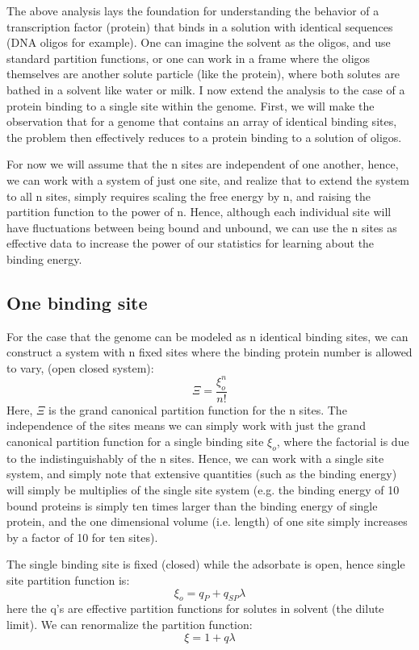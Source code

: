 The above analysis lays the foundation for understanding the behavior of a transcription factor (protein) that binds in a solution with identical sequences (DNA oligos for example).  One can imagine the solvent as the oligos, and use standard partition functions, or one can work in a frame where the oligos themselves are another solute particle (like the protein), where both solutes are bathed in a solvent like water or milk.  I now extend the analysis to the case of a protein binding to a single site within the genome.  First, we will make the observation that for a genome that contains an array of identical binding sites, the problem then effectively reduces to a protein binding to a solution of oligos.

For now we will assume that the n sites are independent of one another, hence, we can work with a system of just one site, and realize that to extend the system to all n sites, simply requires scaling the free energy by n, and raising the partition function to the power of n.  Hence, although each individual site will have fluctuations between being bound and unbound, we can use the n sites as effective data to increase the power of our statistics for learning about the binding energy.
\subsection{One binding site}
For the case that the genome can be modeled as n identical binding sites, we can construct a system with n fixed sites where the binding protein number is allowed to vary, (open closed system):
\begin{equation}\label{}
  \Xi = \frac{\xi_o^n}{n!}
\end{equation}
 Here, $\Xi$ is the grand canonical partition function for the n sites.  The independence of the sites means we can simply work with just the grand canonical partition function for a single binding site $\xi_o$, where the factorial is due to the indistinguishably of the n sites.  Hence, we can work with a single site system, and simply note that extensive quantities (such as the binding energy) will simply be multiplies of the single site system (e.g. the binding energy of 10 bound proteins is simply ten times larger than the binding energy of single protein, and the one dimensional volume (i.e. length) of one site simply increases by a factor of 10 for ten sites).


The single binding site is fixed (closed) while the adsorbate is open, hence single site partition function is:
\begin{equation}\label{}
  \xi_o = q_P + q_{SP} \lambda
\end{equation}
here the q's are effective partition functions for solutes in solvent (the dilute limit).  We can renormalize the partition function:
\begin{equation}\label{}
  \xi = 1 + q \lambda
\end{equation}

